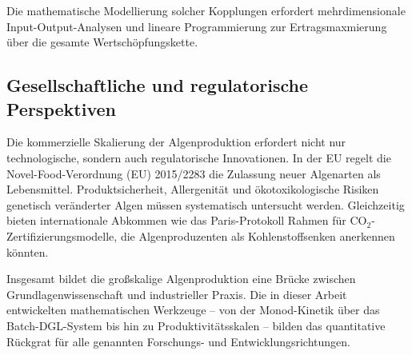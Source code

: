 ﻿\documentclass[a4paper,12pt]{article}
\theoremstyle{definition}
\begin{document}
Die mathematische Modellierung solcher Kopplungen erfordert mehrdimensionale
Input-Output-Analysen und lineare Programmierung zur Ertragsmaxmierung
über die gesamte Wertschöpfungskette.

\subsection{Gesellschaftliche und regulatorische Perspektiven}

Die kommerzielle Skalierung der Algenproduktion erfordert nicht nur technologische,
sondern auch regulatorische Innovationen. In der EU regelt die Novel-Food-Verordnung
(EU) 2015/2283 die Zulassung neuer Algenarten als Lebensmittel. Produktsicherheit,
Allergenität und ökotoxikologische Risiken genetisch veränderter Algen müssen
systematisch untersucht werden. Gleichzeitig bieten internationale Abkommen wie
das Paris-Protokoll Rahmen für CO$_2$-Zertifizierungsmodelle, die Algenproduzenten
als Kohlenstoffsenken anerkennen könnten.

Insgesamt bildet die großskalige Algenproduktion eine Brücke zwischen
Grundlagenwissenschaft und industrieller Praxis. Die in dieser Arbeit entwickelten
mathematischen Werkzeuge -- von der Monod-Kinetik über das Batch-DGL-System bis hin
zu Produktivitätsskalen -- bilden das quantitative Rückgrat für alle genannten
Forschungs- und Entwicklungsrichtungen.
\end{document}

